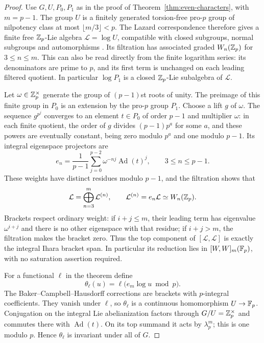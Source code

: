 \begin{proof}
Use $G,U,P_0,P_1$ as in the proof of
Theorem~\ref{thm:even-characters}, with $m=p-1$.
The group $U$ is a finitely generated torsion-free pro-$p$ group of
nilpotency class at most $\lfloor m/3\rfloor<p$.
The Lazard correspondence therefore gives a finite free
$\mathbb Z_p$-Lie algebra $\mathcal L=\log U$, compatible with closed subgroups,
normal subgroups and automorphisms
\cite[Theorem 1(c)--(f)]{LazardTransport}.
Its filtration has associated graded $W_n(\mathbb Z_p)$ for $3\leq n\leq m$.
This can also be read directly from the finite logarithm series: its
denominators are prime to $p$, and its first term is unchanged on each
leading filtered quotient.  In particular
$\log P_1$ is a closed $\mathbb Z_p$-Lie subalgebra of $\mathcal L$.

Let $\omega\in\mathbb Z_p^\times$ generate the group of $(p-1)$st roots of
unity.  The preimage of this finite group in $P_0$ is an extension by
the pro-$p$ group $P_1$.  Choose a lift $g$ of $\omega$.  The sequence
$g^{p^j}$ converges to an element $t\in P_0$ of order $p-1$ and
multiplier $\omega$: in each finite quotient, the order of $g$ divides
$(p-1)p^a$ for some $a$, and these powers are eventually constant, being zero
modulo $p^a$ and one modulo $p-1$.  Its integral eigenspace projectors are
\[
 e_n=\frac1{p-1}\sum_{j=0}^{p-2}\omega^{-nj}\operatorname{Ad}(t)^j,
        \qquad 3\leq n\leq p-1.
\]
These weights have distinct residues modulo $p-1$, and the filtration
shows that
\[
 \mathcal L=\bigoplus_{n=3}^{m}\mathcal L^{(n)},\qquad
 \mathcal L^{(n)}=e_n\mathcal L\simeq W_n(\mathbb Z_p).
\]
Brackets respect ordinary weight: if $i+j\leq m$, their leading term
has eigenvalue $\omega^{i+j}$ and there is no other eigenspace with that
residue; if $i+j>m$, the filtration makes the bracket zero.
Thus the top component of $[\mathcal L,\mathcal L]$ is exactly the
integral Ihara bracket span.  In particular its reduction lies in
$[W,W]_m(\mathbb F_p)$, with no saturation assertion required.

For a functional $\ell$ in the theorem define
\[
 \theta_\ell(u)=\ell\bigl(e_m\log u\bmod p\bigr).
\]
The Baker--Campbell--Hausdorff corrections are brackets with
$p$-integral coefficients.  They vanish under $\ell$, so $\theta_\ell$
is a continuous homomorphism $U\to\mathbb F_p$.
Conjugation on the integral Lie abelianization factors through
$G/U=\mathbb Z_p^\times$ and commutes there with $\operatorname{Ad}(t)$.
On its top summand it acts by $\lambda_p^m$; this is one modulo $p$.
Hence $\theta_\ell$ is invariant under all of $G$.


\end{proof}
